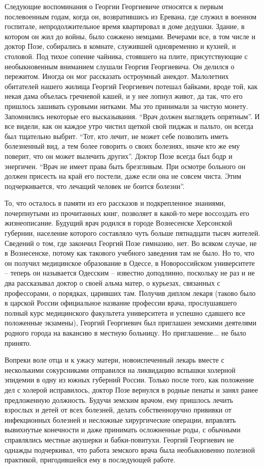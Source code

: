 Следующие воспоминания о Георгии Георгиевиче относятся к первым послевоенным
годам, когда он, возвратившись из Еревана, где служил в военном госпитале,
непродолжительное  время квартировал в доме дедушки. Здание, в котором он жил
до войны, было сожжено немцами.  Вечерами все, в том числе и доктор Позе,
собирались в комнате, служившей одновременно и кухней, и столовой. Под тихое
сопение чайника, стоявшего на плите, присутствующие с необыкновенным вниманием
слушали Георгия Георгиевича. Он делился  о пережитом. Иногда он мог рассказать
остроумный анекдот. Малолетних обитателей нашего жилища Георгий Георгиевич
потешал байками, вроде той, как некая дама объелась гречневой кашей, и у нее
лопнул живот, да так, что его пришлось зашивать суровыми нитками. Мы это
принимали за чистую монету. Запомнились некоторые его высказывания. \enquote{Врач
должен выглядеть опрятным}. И все видели, как он каждое утро чистил щеткой свой
пиджак и пальто, он всегда был тщательно выбрит. \enquote{Тот, кто лечит, не может себе
позволить иметь болезненный вид, а тем более говорить о своих болезнях, иначе
кто же ему поверит, что он может вылечить других}. Доктор Позе всегда был бодр
и энергичен. \enquote{Врач  не имеет права быть брезгливым. При осмотре больного он
должен присесть на край его постели, даже если она не совсем чиста. Этим
подчеркивается, что лечащий человек не боится болезни}.

То, что осталось в памяти из его рассказов и подкрепленное знаниями,
почерпнутыми из прочитанных книг, позволяет в какой-то мере воссоздать его
жизнеописание. Будущий врач родился в городе Вознесенске Херсонской губернии,
население которого составляло чуть больше пятнадцати тысяч жителей. Сведений о
том, где закончил Георгий Позе гимназию, нет. Во всяком случае, не в
Вознесенске, потому как такового учебного заведения там не было. Но то, что он
получил медицинское образование в Одессе, в  Новороссийском университете –
теперь он называется Одесским  –  известно доподлинно, поскольку не раз и не
два рассказывал доктор  о своей альма матер, о курьезах, связанных с
профессорами, о порядках, царивших там. Получив диплом лекаря (таково было в
царской России официальное название профессии врача, прослушавшего полный курс
медицинского факультета университета и успешно сдавшего все положенные
экзамены),  Георгий Георгиевич был приглашен земскими деятелями родного города
на вакансию в местную больницу. Но приглашение... не было принято.

Вопреки воле отца и к ужасу матери, новоиспеченный лекарь вместе с несколькими
сокурсниками отправился на ликвидацию вспышки холерной эпидемии в одну из южных
губерний России. Только после того, как положение дел с холерой исправилось,
доктор Позе вернулся в родные пенаты и занял ранее предложенную должность.
Будучи земским врачом, ему пришлось лечить взрослых и детей от всех болезней,
делать собственноручно прививки от инфекционных болезней и несложные
хирургические операции, вправлять вывихнутые конечности и даже принимать
осложненные роды, с обычными справлялись местные акушерки и бабки-повитухи.
Георгий Георгиевич не однажды подчеркивал, что работа  земского врача была
необыкновенно полезной практикой, пригодившейся ему в последующей работе. 

